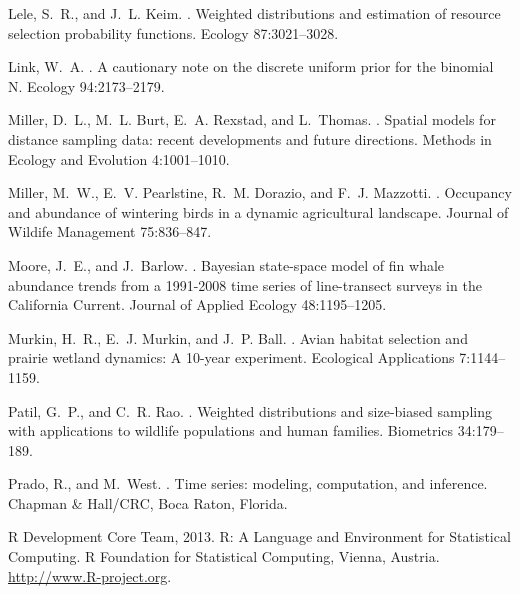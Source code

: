 \documentclass[12pt,english]{article}
\begin{document}
\begin{spacing}{1.9}
\begin{thebibliography}{59}
Lele, S.~R., and J.~L. Keim.
.
\newblock Weighted distributions and estimation of resource selection
  probability functions.
\newblock Ecology { 87}:3021--3028.

Link, W.~A.
.
\newblock A cautionary note on the discrete uniform prior for the binomial N.
\newblock Ecology { 94}:2173--2179.

Miller, D.~L., M.~L. Burt, E.~A. Rexstad, and L.~Thomas.
.
\newblock Spatial models for distance sampling data: recent developments and
  future directions.
\newblock Methods in Ecology and Evolution { 4}:1001--1010.

Miller, M.~W., E.~V. Pearlstine, R.~M. Dorazio, and F.~J. Mazzotti.
.
\newblock Occupancy and abundance of wintering birds in a dynamic agricultural
  landscape.
\newblock Journal of Wildife Management { 75}:836--847.

Moore, J.~E., and J.~Barlow.
.
\newblock Bayesian state-space model of fin whale abundance trends from a
  1991-2008 time series of line-transect surveys in the {C}alifornia {C}urrent.
\newblock Journal of Applied Ecology { 48}:1195--1205.

Murkin, H.~R., E.~J. Murkin, and J.~P. Ball.
.
\newblock Avian habitat selection and prairie wetland dynamics: A 10-year
  experiment.
\newblock Ecological Applications { 7}:1144--1159.

Patil, G.~P., and C.~R. Rao.
.
\newblock Weighted distributions and size-biased sampling with applications to
  wildlife populations and human families.
\newblock Biometrics { 34}:179--189.

Prado, R., and M.~West.
.
\newblock Time series: modeling, computation, and inference.
\newblock Chapman \& Hall/CRC, Boca Raton, Florida.

{R Development Core Team}, 2013.
\newblock R: A Language and Environment for Statistical Computing.
\newblock R Foundation for Statistical Computing, Vienna, Austria.
\newblock \urlprefix\url{http://www.R-project.org}.


\end{thebibliography}
\end{spacing}
\end{document}
